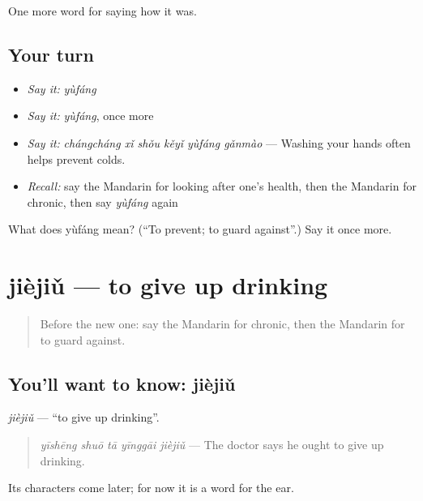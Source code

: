 \begin{grammarlens}[title={What you've built}]
One more word for saying how it was.
\end{grammarlens}

\subsection*{Your turn}
\begin{itemize}
\raggedright
  \item \emph{Say it:} \emph{yùfáng}
  \item \emph{Say it:} \emph{yùfáng}, once more
  \item \emph{Say it:} \emph{chángcháng xǐ shǒu kěyǐ yùfáng gǎnmào} — Washing your hands often helps prevent colds.
  \item \emph{Recall:} say the Mandarin for looking after one's health, then the Mandarin for chronic, then say \emph{yùfáng} again
\end{itemize}

\begin{tcolorbox}[breakable,colback=teal!4,colframe=teal!35!black,title={Before you move on}]
What does yùfáng mean? (\textquotedblleft{}To prevent; to guard against\textquotedblright{}.) Say it once more.
\end{tcolorbox}
\section[jièjiǔ]{jièjiǔ — to give up drinking}

\label{lesson:ZH-C484-jiejiu}



\begin{quote}
Before the new one: say the Mandarin for chronic, then the Mandarin for to guard against.
\end{quote}

\subsection*{You'll want to know: jièjiǔ}
\emph{jièjiǔ} — \textquotedblleft{}to give up drinking\textquotedblright{}.

\begin{quote}
\emph{yīshēng shuō tā yīnggāi jièjiǔ} — The doctor says he ought to give up drinking.
\end{quote}

Its characters come later; for now it is a word for the ear.

